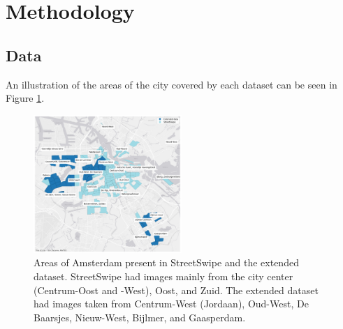 \section{Methodology}
\label{sec:methodology}

\subsection{Data}

An illustration of the areas of the city covered by each dataset can be seen in Figure \ref{fig:map}.

{
\setlength\intextsep{7pt}
\begin{figure}[h!]
    \includegraphics[width=0.5\textwidth]{media/methodology/map1.png}
    \caption{Areas of Amsterdam present in StreetSwipe and the extended dataset. StreetSwipe had images mainly from the city center (Centrum-Oost and -West), Oost, and Zuid. The extended dataset had images taken from Centrum-West (Jordaan), Oud-West, De Baarsjes, Nieuw-West, Bijlmer, and Gaasperdam.}
    \label{fig:map}
\end{figure}
}

